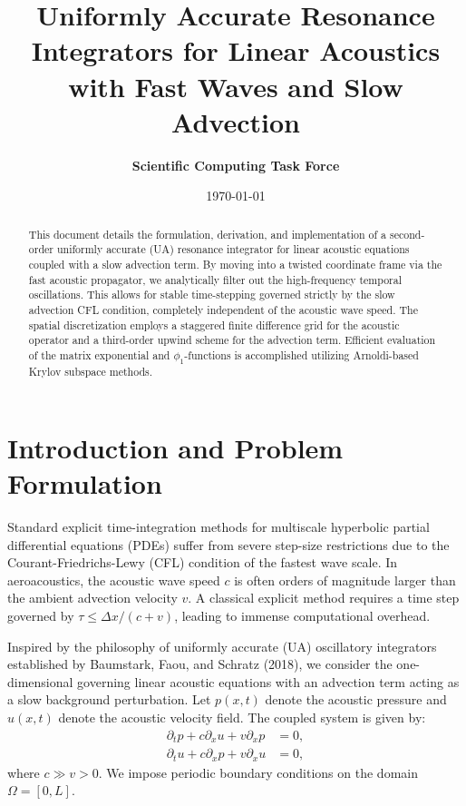 \documentclass[11pt,a4paper]{article}
\title{\textbf{Uniformly Accurate Resonance Integrators for Linear Acoustics with Fast Waves and Slow Advection}}
\author{\textbf{Scientific Computing Task Force}}
\date{\today}
\begin{document}
\maketitle

\begin{abstract}
This document details the formulation, derivation, and implementation of a second-order uniformly accurate (UA) resonance integrator for linear acoustic equations coupled with a slow advection term. By moving into a twisted coordinate frame via the fast acoustic propagator, we analytically filter out the high-frequency temporal oscillations. This allows for stable time-stepping governed strictly by the slow advection CFL condition, completely independent of the acoustic wave speed. The spatial discretization employs a staggered finite difference grid for the acoustic operator and a third-order upwind scheme for the advection term. Efficient evaluation of the matrix exponential and $\phi_1$-functions is accomplished utilizing Arnoldi-based Krylov subspace methods.
\end{abstract}

\section{Introduction and Problem Formulation}
Standard explicit time-integration methods for multiscale hyperbolic partial differential equations (PDEs) suffer from severe step-size restrictions due to the Courant-Friedrichs-Lewy (CFL) condition of the fastest wave scale. In aeroacoustics, the acoustic wave speed $c$ is often orders of magnitude larger than the ambient advection velocity $v$. A classical explicit method requires a time step governed by $\tau \le \Delta x / (c + v)$, leading to immense computational overhead.

Inspired by the philosophy of uniformly accurate (UA) oscillatory integrators established by Baumstark, Faou, and Schratz (2018), we consider the one-dimensional governing linear acoustic equations with an advection term acting as a slow background perturbation. Let $p(x,t)$ denote the acoustic pressure and $u(x,t)$ denote the acoustic velocity field. The coupled system is given by:
\begin{align}
    \partial_t p + c \partial_x u + v \partial_x p &= 0, \label{eq:p_cont} \\
    \partial_t u + c \partial_x p + v \partial_x u &= 0, \label{eq:u_cont}
\end{align}
where $c \gg v > 0$. We impose periodic boundary conditions on the domain $\Omega = [0, L]$.
\end{document}
